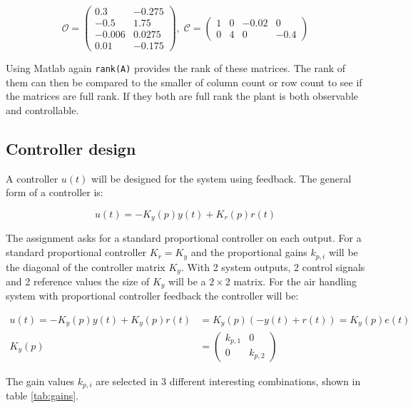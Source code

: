 \documentclass[a4paper, titlepage]{article}
\begin{document}
\begin{equation}
\mathcal{O} = 
\begin{pmatrix}
0.3 & -0.275		\\
-0.5 & 1.75		\\
-0.006 & 0.0275	\\
0.01 & -0.175
\end{pmatrix}
,\;
\mathcal{C} = 
\begin{pmatrix}
1 & 0 & -0.02 & 0 \\
0 & 4 & 0 & -0.4
\end{pmatrix}
\end{equation}

Using Matlab again \verb|rank(A)| provides the rank of these matrices.
The rank of them can then be compared to the smaller of column count or row count to see if the matrices are full rank.
If they both are full rank the plant is both observable and controllable.

\subsection{Controller design}
A controller $u(t)$ will be designed for the system using feedback.
The general form of a controller is:

\begin{equation}
u(t) = -K_y(p)y(t) + K_r(p)r(t)
\end{equation}

The assignment asks for a standard proportional controller on each output.
For a standard proportional controller $K_r = K_y$ and the proportional gains $k_{p,i}$ will be the diagonal of the controller matrix $K_y$.
With 2 system outputs, 2 control signals and 2 reference values the size of $K_y$ will be a $2 \times 2$ matrix.
For the air handling system with proportional controller feedback the controller will be:

\begin{equation}
\begin{split}
u(t) = -K_y(p)y(t) + K_y(p)r(t) &= 
K_y(p)(-y(t) + r(t)) = 
K_y(p)e(t) \\
K_y(p) &= 
\begin{pmatrix}
k_{p,1} 	& 	0 		\\
0 		&	k_{p,2}	
\end{pmatrix}
\end{split}
\end{equation}

The gain values $k_{p,i}$ are selected in 3 different interesting combinations, shown in table \ref{tab:gains}.
\end{document}
